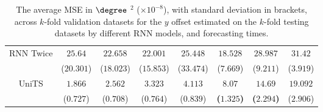 \begin{table}[!ht]
{\begin{tabular}{|c|c|c|c|c|c|c|c|}
			\multirow{2}{*}{RNN Twice} & $25.64$ & $22.658$ & $22.001$ & $25.448$ & $18.528$ & $28.987$ & $31.42$ \\
			 & ($20.301$) & ($18.023$) & ($15.853$) & ($33.474$) & ($7.669$) & ($9.211$) & ($3.919$) \\ \hline
			\multirow{2}{*}{UniTS} & $1.866$ & $2.562$ & $3.323$ & $4.113$ & $\mathbf{8.07}$ & $\mathbf{14.69}$ & $19.092$ \\
			 & ($0.727$) & ($0.708$) & ($0.764$) & ($0.839$) & \textbf{(}$\mathbf{1.325}$\textbf{)} & \textbf{(}$\mathbf{2.294}$\textbf{)} & ($2.906$) \\ \hline
		\end{tabular}
	}
	\caption{The average MSE in $\degree$ $^{2}$ ($\times 10^{-8}$), with standard deviation in brackets, across $k$-fold validation datasets for the $y$ offset estimated on the $k$-fold testing datasets by different RNN models, and forecasting times.}
	\label{tab:all_latitude_no_abs_MSE}
\end{table}

